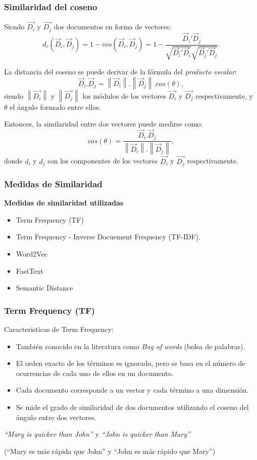 \begin{frame}[allowframebreaks]
	\frametitle{Similaridad del coseno}
	Siendo \(\overrightarrow{D_i}\) y \(\overrightarrow{D_j}\) dos documentos en forma de vectores:
	\[d_c(\vec{D}_i, \vec{D}_j) = 1 - cos(\vec{D}_i, \vec{D}_j) = 1 - \frac{{\vec{D}_i}'\vec{D}_j}{\sqrt{{\vec{D}_i}'\vec{D}_i}\sqrt{{\vec{D}_j}'\vec{D}_j}}.\]

	\bigskip
	La distancia del coseno se puede derivar de la fórmula del \textit{producto escalar}:
	\[\vec{D}_i.\vec{D}_j = \left \| \vec{D}_i \right \|.\left \| \vec{D}_j \right \|.cos(\theta),\]
	siendo \(\left \|\overrightarrow{D_i}\right \|\) y \(\left \|\overrightarrow{D_j}\right \|\) los módulos de los vectores \(\overrightarrow{D_i}\) y \(\overrightarrow{D_j}\) respectivamente, y $\theta$ el ángulo formado entre ellos.

	\framebreak

	Entonces, la similaridad entre dos vectores puede medirse como:
	\[cos(\theta) = \frac{\vec{D}_i.\vec{D}_j}{\left \| \vec{D}_i \right \|.\left \| \vec{D}_j \right \|},\]
	donde \(d_i\) y \(d_j\) son los componentes de los vectores \(\overrightarrow{D_i}\) y \(\overrightarrow{D_j}\) respectivamente.
\end{frame}

\begin{frame}
	\frametitle{Medidas de Similaridad}
	\textbf{Medidas de similaridad utilizadas}
	\bigskip
	\begin{itemize}[<*>]
		\item Term Frequency (TF)
		\item Term Frequency - Inverse Docuement Frequency (TF-IDF).
		\item Word2Vec
		\item FastText
		\item Semantic Distance
	\end{itemize}
\end{frame}

\begin{frame}
	\frametitle{Term Frequency (TF)}
	Caracteristicas de Term Frequency:
	\bigskip
	\begin{itemize}[<*>]
		\item También conocido en la literatura como \textit{Bag of words} (bolsa de palabras).
		\item El orden exacto de los términos es ignorado, pero se basa en el número de ocurrencias de cada uno de ellos en un documento.
		\item Cada documento corresponde a un vector y cada término a una dimensión.
		\item Se mide el grado de similaridad de dos documentos utilizando el coseno del ángulo entre dos vectores.
	\end{itemize}

	\bigskip
	\centering
	\textit{“Mary is quicker than John”} y \textit{“John is quicker than Mary”} \\
	\medskip
	\begin{scriptsize}
		(``Mary es más rápida que John'' y ``John es más rápido que Mary'')
	\end{scriptsize}
\end{frame}

